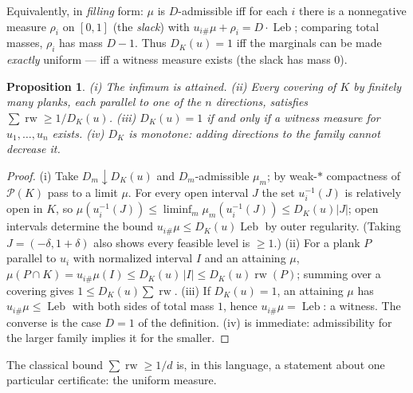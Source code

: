 \documentclass[11pt,reqno]{amsart}
\theoremstyle{plain}
\newtheorem{proposition}[theorem]{Proposition}
\theoremstyle{definition}
\theoremstyle{remark}
\newcommand{\rw}{\operatorname{rw}}
\newcommand{\Leb}{\operatorname{Leb}}
\begin{document}
Equivalently, in \emph{filling} form: $\mu$ is $D$-admissible iff for each $i$
there is a nonnegative measure $\rho_i$ on $[0,1]$ (the \emph{slack}) with
$u_{i\#}\mu+\rho_i=D\cdot\Leb$; comparing total masses, $\rho_i$ has mass
$D-1$. Thus $D_K(u)=1$ iff the marginals can be made \emph{exactly} uniform ---
iff a witness measure exists (the slack has mass $0$).

\begin{proposition}\label{prop:defect}
(i) The infimum is attained. (ii) Every covering of $K$ by finitely many
planks, each parallel to one of the $n$ directions, satisfies
$\sum\rw\ge 1/D_K(u)$. (iii) $D_K(u)=1$ if and only if a witness measure for
$u_1,\dots,u_n$ exists. (iv) $D_K$ is monotone: adding directions to the
family cannot decrease it.
\end{proposition}

\begin{proof}
(i) Take $D_m\downarrow D_K(u)$ and $D_m$-admissible $\mu_m$; by weak-$*$
compactness of $\mathcal P(K)$ pass to a limit $\mu$. For every open interval
$J$ the set $u_i^{-1}(J)$ is relatively open in $K$, so
$\mu(u_i^{-1}(J))\le\liminf_m\mu_m(u_i^{-1}(J))\le D_K(u)|J|$; open intervals
determine the bound $u_{i\#}\mu\le D_K(u)\Leb$ by outer regularity. (Taking
$J=(-\delta,1+\delta)$ also shows every feasible level is $\ge1$.)
(ii) For a plank $P$ parallel to $u_i$ with normalized interval $I$ and an
attaining $\mu$,
$\mu(P\cap K)=u_{i\#}\mu(I)\le D_K(u)\,|I|\le D_K(u)\rw(P)$; summing over a
covering gives $1\le D_K(u)\sum\rw$.
(iii) If $D_K(u)=1$, an attaining $\mu$ has $u_{i\#}\mu\le\Leb$ with both sides
of total mass $1$, hence $u_{i\#}\mu=\Leb$: a witness. The converse is the case
$D=1$ of the definition. (iv) is immediate: admissibility for the larger family
implies it for the smaller.
\end{proof}

The classical bound $\sum\rw\ge1/d$ is, in this language, a statement about
one particular certificate: the uniform measure.
\end{document}
